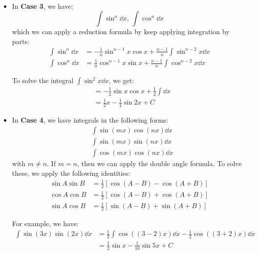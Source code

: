 \begin{itemize}
\begin{example}
\begin{align}
        \end{align}
    \end{example}
    \item In \textbf{Case 3}, we have:
    \begin{equation}
        \int \sin^n \dd{x},\, \int \cos^n \dd{x}
    \end{equation}
    which we can apply a reduction formula by keep applying integration by parts:
    \begin{align}
        \int \sin^n \dd{x} &= -\frac{1}{n}\sin^{n-1}x \cos x + \frac{n-1}{n} \int \sin^{n-2}x \dd{x} \\ 
        \int \cos^n \dd{x} &= \frac{1}{n}\cos^{n-1}x\sin x + \frac{n-1}{n}\int \cos^{n-2}x \dd{x}
    \end{align}
    \begin{example}
        To solve the integral $\int \sin^2 x \dd{x}$, we get:
        \begin{align}
            &= -\frac{1}{2}\sin x\cos x + \frac{1}{2} \int \dd{x} \\ 
            &= \frac{1}{2}x - \frac{1}{4}\sin 2x + C
        \end{align}
    \end{example}
    \item In \textbf{Case 4}, we have integrals in the following forms:
    \begin{align}
        &\int \sin(mx) \cos(nx) \dd{x} \\ 
        &\int \sin(mx) \sin(nx) \dd{x} \\ 
        &\int \cos(mx) \cos(nx) \dd{x}
    \end{align}
    with $m\neq n$. If $m=n$, then we can apply the double angle formula. To solve these, we apply the following identities:
    \begin{align}
        \sin A \sin B &= \frac{1}{2}\left[\cos(A-B) - \cos(A+B)\right] \\ 
        \cos A \cos B &= \frac{1}{2}\left[\cos(A-B) + \cos(A+B)\right] \\ 
        \sin A \cos B &= \frac{1}{2}\left[\sin(A-B) + \sin(A+B)\right]
    \end{align}
    \begin{example}
        For example, we have:
        \begin{align}
            \int \sin(3x)\sin(2x) \dd{x} &= \frac{1}{2} \int \cos((3-2)x) \dd{x} - \frac{1}{2}\cos((3+2)x) \dd{x} \\ 
            &= \frac{1}{2}\sin x - \frac{1}{10}\sin 5x + C

\end{align}
\end{example}
\end{itemize}
